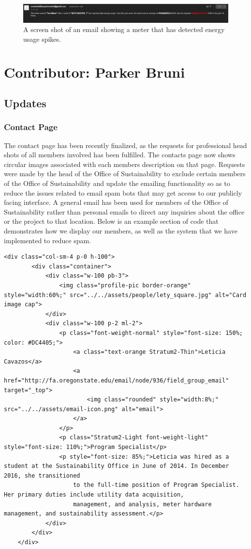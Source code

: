 \documentclass[letterpaper,10pt,serif,draftclsnofoot,onecolumn,compsoc,titlepage]{IEEEtran}
\begin{document}
\begin{figure}[H]
  \centering
  \includegraphics[width=17cm]{images/usage.eps}  
  \caption{A screen shot of an email showing a meter that has detected energy usage spikes.}
\end{figure}

\section{Contributor: Parker Bruni}

\subsection{Updates}
\subsubsection{Contact Page}
The contact page has been recently finalized, as the requests for professional head shots of all members involved has been fulfilled. The contacts page now shows circular images associated with each members description on that page. Requests were made by the head of the Office of Sustainability to exclude certain members of the Office of Sustainability and update the emailing functionality so as to reduce the issues related to email spam bots that may get access to our publicly facing interface. A general email has been used for members of the Office of Sustainability rather than personal emails to direct any inquiries about the office or the project to that location.
Below is an example section of code that demonstrates how we display our members, as well as the system that we have implemented to reduce spam. 

\begin{lstlisting}
<div class="col-sm-4 p-0 h-100">
        <div class="container">
            <div class="w-100 pb-3">
                <img class="profile-pic border-orange" style="width:60%;" src="../../assets/people/lety_square.jpg" alt="Card image cap">
            </div>
            <div class="w-100 p-2 ml-2">
                <p class="font-weight-normal" style="font-size: 150%; color: #DC4405;">
                    <a class="text-orange Stratum2-Thin">Leticia Cavazos</a>
                    <a href="http://fa.oregonstate.edu/email/node/936/field_group_email" target="_top">
                        <img class="rounded" style="width:8%;" src="../../assets/email-icon.png" alt="email">
                    </a>
                </p>
                <p class="Stratum2-Light font-weight-light" style="font-size: 110%;">Program Specialist</p>
                <p style="font-size: 85%;">Leticia was hired as a student at the Sustainability Office in June of 2014. In December 2016, she transitioned
                    to the full-time position of Program Specialist. Her primary duties include utility data acquisition,
                    management, and analysis, meter hardware management, and sustainability assessment.</p>
            </div>
        </div>
    </div>
\end{lstlisting}
\end{document}
